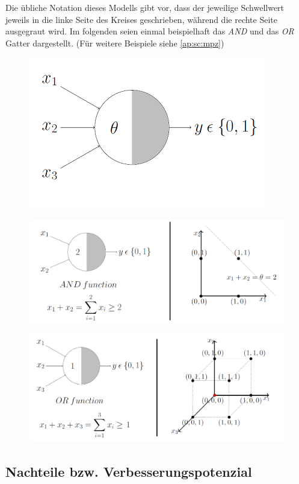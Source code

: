 Die übliche Notation dieses Modells gibt vor, dass der jeweilige Schwellwert jeweils in die linke Seite des Kreises geschrieben, während die rechte Seite ausgegraut wird. Im folgenden seien einmal beispielhaft das \emph{AND} und das \emph{OR} Gatter dargestellt. (Für weitere Beispiele siehe \autoref{ap:sc:mpz})

\begin{figure}[!htb]
	\centering
	\includegraphics[width=.4\linewidth]{img/aufbau2}
	\label{fig:mpn_aufbau}
\end{figure}

\begin{figure}[!htb]
	\centering
	\includegraphics[width=.8\linewidth]{img/mpn_and}
	\label{fig:mpn_and}
\end{figure}

\begin{figure}[!htb]
	\centering
	\includegraphics[width=.9\linewidth]{img/mpn_or}
	\label{fig:mpn_or}
\end{figure}


\subsection{Nachteile bzw. Verbesserungspotenzial}

